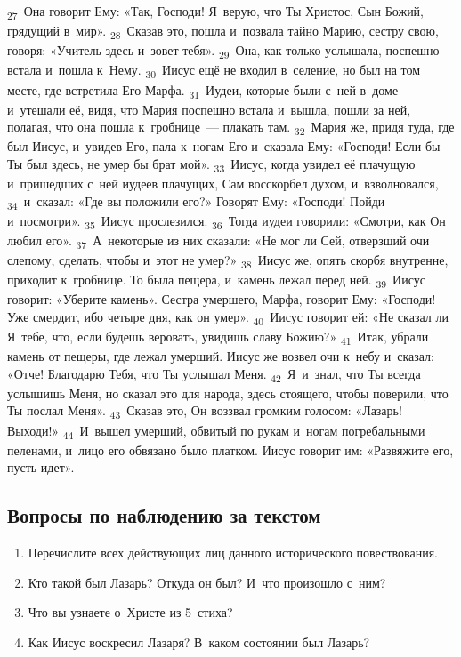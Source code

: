 \documentclass[a4paper,12pt]{article}
\begin{document}
\textsubscript{27}~Она говорит Ему: «Так, Господи! Я~верую, что Ты Христос, Сын Божий, грядущий в~мир».
\textsubscript{28}~Сказав это, пошла и~позвала тайно Марию, сестру свою, говоря: «Учитель здесь и~зовет тебя».
\textsubscript{29}~Она, как только услышала, поспешно встала и~пошла к~Нему.
\textsubscript{30}~Иисус ещё не входил в~селение, но был на том месте, где встретила Его Марфа.
\textsubscript{31}~Иудеи, которые были с~ней в~доме и~утешали её, видя, что Мария поспешно встала и~вышла, пошли за ней, полагая, что она пошла к~гробнице~--- плакать там.
\textsubscript{32}~Мария же, придя туда, где был Иисус, и~увидев Его, пала к~ногам Его и~сказала Ему: «Господи! Если бы Ты был здесь, не умер бы брат мой».
\textsubscript{33}~Иисус, когда увидел её плачущую и~пришедших с~ней иудеев плачущих, Сам восскорбел духом, и~взволновался,
\textsubscript{34}~и~сказал: «Где вы положили его?» Говорят Ему: «Господи! Пойди и~посмотри».
\textsubscript{35}~Иисус прослезился.
\textsubscript{36}~Тогда иудеи говорили: «Смотри, как Он любил его».
\textsubscript{37}~А~некоторые из них сказали: «Не мог ли Сей, отверзший очи слепому, сделать, чтобы и~этот не умер?»
\textsubscript{38}~Иисус же, опять скорбя внутренне, приходит к~гробнице. То была пещера, и~камень лежал перед ней.
\textsubscript{39}~Иисус говорит: «Уберите камень». Сестра умершего, Марфа, говорит Ему: «Господи! Уже смердит, ибо четыре дня, как он умер».
\textsubscript{40}~Иисус говорит ей: «Не сказал ли Я~тебе, что, если будешь веровать, увидишь славу Божию?»
\textsubscript{41}~Итак, убрали камень от пещеры, где лежал умерший. Иисус же возвел очи к~небу и~сказал: «Отче! Благодарю Тебя, что Ты услышал Меня.
\textsubscript{42}~Я~и~знал, что Ты всегда услышишь Меня, но сказал это для народа, здесь стоящего, чтобы поверили, что Ты послал Меня».
\textsubscript{43}~Сказав это, Он воззвал громким голосом: «Лазарь! Выходи!»
\textsubscript{44}~И~вышел умерший, обвитый по рукам и~ногам погребальными пеленами, и~лицо его обвязано было платком. Иисус говорит им: «Развяжите его, пусть идет». 

\subsection*{Вопросы по наблюдению за текстом}
\begin{enumerate}
    \item Перечислите всех действующих лиц данного исторического повествования. 
    
    \myline
    
    \myline
    \item Кто такой был Лазарь? Откуда он был? И~что произошло с~ним? 
    
    \myline
    
    \myline
    \item Что вы узнаете о~Христе из 5~стиха? 
    
    \myline
    
    \myline
    \item Как Иисус воскресил Лазаря? В~каком состоянии был Лазарь? 
    
    \myline
    
    \myline
\end{enumerate}
\end{document}
